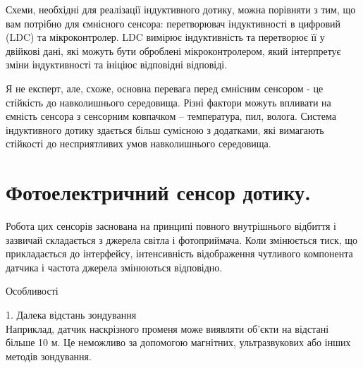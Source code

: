 \documentclass[a4paper,fontsize=12]{report}
\begin{document}
  Схеми, необхідні для реалізації індуктивного дотику, можна порівняти з тим, що вам потрібно для ємнісного  сенсора: перетворювач індуктивності в цифровий (LDC) та мікроконтролер. LDC вимірює індуктивність та перетворює її у двійкові дані, які можуть бути оброблені мікроконтролером, який інтерпретує зміни індуктивності та ініціює відповідні відповіді.

  \begin{figure}[h]
  \end{figure}

  Я не експерт, але, схоже, основна перевага перед ємнісним сенсором - це стійкість до навколишнього середовища. Різні фактори можуть впливати на ємність сенсора з сенсорним ковпачком -- температура, пил, волога. Система індуктивного дотику здається більш сумісною з додатками, які вимагають стійкості до несприятливих умов навколишнього середовища.
\chapter{Фотоелектричний сенсор дотику.}
    Робота цих сенсорів заснована на принципі повного внутрішнього відбиття і зазвичай складається з джерела світла і 
    фотоприймача. Коли змінюється тиск, що прикладається до інтерфейсу, інтенсивність відображення чутливого компонента датчика і частота джерела змінюються відповідно.\\ 

    \begin{center}  Особливості \end{center}

1. Далека відстань зондування\\ 
Наприклад, датчик наскрізного променя може виявляти об’єкти на відстані більше 10 м. Це неможливо за допомогою магнітних, ультразвукових або інших методів зондування.\par
\end{document}
